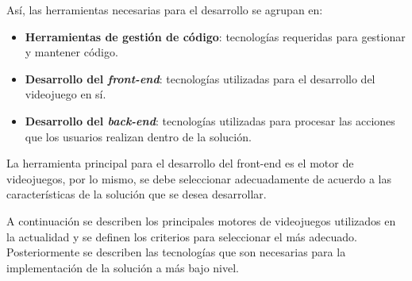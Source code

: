 Así, las herramientas necesarias para el desarrollo se agrupan en:

\begin{itemize}
    \item \textbf{Herramientas de gestión de código}: 
        tecnologías requeridas para gestionar y mantener código.
    \item \textbf{Desarrollo del \textit{front-end}}: 
        tecnologías utilizadas para el desarrollo del videojuego en sí. 
    \item \textbf{Desarrollo del \textit{back-end}}: 
        tecnologías utilizadas para procesar las acciones que los usuarios
        realizan dentro de la solución.
\end{itemize}

La herramienta principal para el desarrollo del front-end es el motor de videojuegos, por lo 
mismo, se debe seleccionar adecuadamente de acuerdo a las características de la solución que 
se desea desarrollar.

A continuación se describen los principales motores de videojuegos utilizados en la actualidad y se 
definen los criterios para seleccionar el más adecuado. Posteriormente se describen las 
tecnologías que son necesarias para la implementación de la solución a más bajo nivel.




